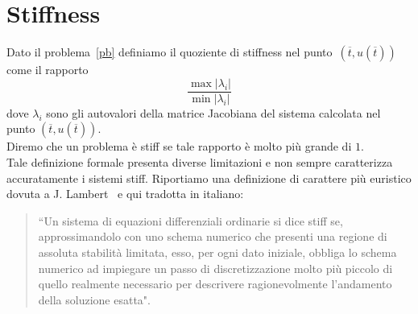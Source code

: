 \section{Stiffness}
Dato il problema~\eqref{pb} definiamo il quoziente di stiffness nel punto~$\left(\overline{t},u\left(\overline{t}\right)\right)$  come il rapporto 
 $$ \frac{ \max \vert\lambda_i \vert }{\min \vert \lambda_i \vert}$$ 
 dove $\lambda_i$ sono gli autovalori della matrice Jacobiana del sistema calcolata nel punto  $\left(\overline{t},u\left(\overline{t}\right)\right)$.\\
 Diremo che un problema \`e stiff se tale rapporto \`e molto pi\`u grande di $1$.\\
Tale definizione formale presenta diverse limitazioni e non sempre caratterizza accuratamente i sistemi stiff.  Riportiamo una definizione di carattere pi\`u euristico dovuta a J. Lambert~\cite{lambert1991numerical} e qui tradotta in italiano:
\begin{quote}
``Un sistema di equazioni differenziali ordinarie si dice stiff se, 
approssimandolo con uno schema numerico che presenti una regione di assoluta stabilit\`a limitata, esso, per ogni dato iniziale, obbliga lo schema numerico ad impiegare un passo di discretizzazione molto pi\`u piccolo di quello realmente necessario per descrivere ragionevolmente l'andamento della soluzione esatta".
\end{quote}
